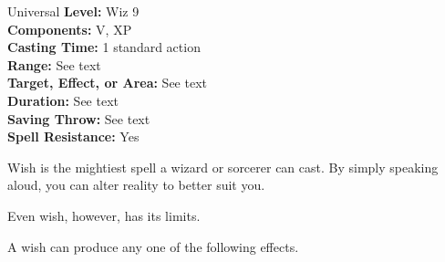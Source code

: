 {Universal}
{
	\textbf{Level:}
	Wiz 9\\
	\textbf{Components:}
	V, XP\\
	\textbf{Casting Time:}
	1 standard action\\
	\textbf{Range:}
	See text\\
	\textbf{Target, Effect, or Area:}
	See text\\
	\textbf{Duration:}
	See text\\
	\textbf{Saving Throw:}
	See text\\
	\textbf{Spell Resistance:}
	Yes\\
}
{
	Wish is the mightiest spell a wizard or sorcerer can cast. By simply speaking aloud, you can alter reality to better suit you.

	Even wish, however, has its limits.

	A wish can produce any one of the following effects.


}
